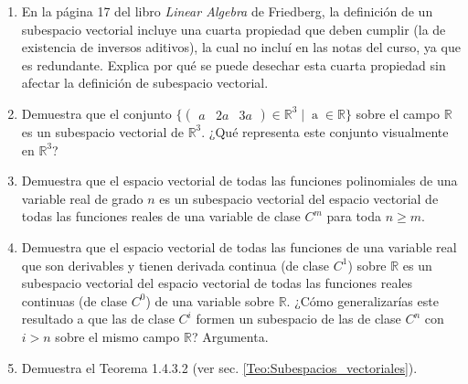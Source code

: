 \documentclass[apuntes]{subfiles}
\begin{document}
\begin{enumerate}
    \item En la página 17 del libro \textit{Linear Algebra} de Friedberg, la definición de un subespacio vectorial incluye una cuarta propiedad que deben cumplir (la de existencia de inversos aditivos), la cual no incluí en las notas del curso, ya que es redundante. Explica por qué se puede desechar esta cuarta propiedad sin afectar la definición de subespacio vectorial. 
    \item Demuestra que el conjunto $\{\begin{pmatrix} a&2a&3a \end{pmatrix}\in\mathbb{R}^3\mathop|\mathop a\in\mathbb{R}\}$ sobre el campo $\mathbb{R}$ es un subespacio vectorial de $\mathbb{R}^3$. ¿Qué representa este conjunto visualmente en $\mathbb{R}^3$? 
    \item Demuestra que el espacio vectorial de todas las funciones polinomiales de una variable real de grado $n$ es un subespacio vectorial del espacio vectorial de todas las funciones reales de una variable de clase $C^m$ para toda $n \geq m$. 
    \item Demuestra que el espacio vectorial de todas las funciones de una variable real que son derivables y tienen derivada continua (de clase $C^1$) sobre $\mathbb{R}$ es un subespacio vectorial del espacio vectorial de todas las funciones reales continuas (de clase $C^0$) de una variable sobre $\mathbb{R}$. ¿Cómo generalizarías este resultado a que las de clase $C^i$ formen un subespacio de las de clase $C^n$ con $i>n$ sobre el mismo campo $\mathbb{R}$? Argumenta. 
    \item Demuestra el Teorema 1.4.3.2 (ver sec. \ref{Teo:Subespacios_vectoriales}). 
\end{enumerate}
\end{document}
